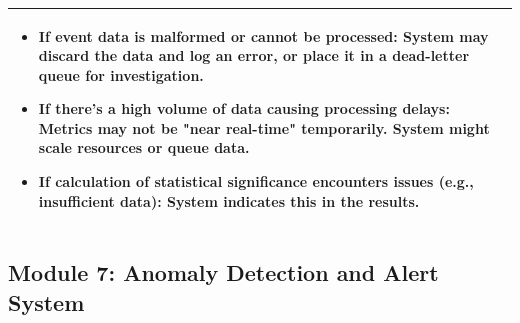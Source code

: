 \begin{minipage}{\textwidth}
\begin{tabularx}{\textwidth}{|p{}|X|}
{        \begin{itemize}
            \item If event data is malformed or cannot be processed: System may discard the data and log an error, or place it in a dead-letter queue for investigation.
            \item If there's a high volume of data causing processing delays: Metrics may not be "near real-time" temporarily. System might scale resources or queue data.
            \item If calculation of statistical significance encounters issues (e.g., insufficient data): System indicates this in the results.
        \end{itemize}%
        } \\
    \hline
\end{tabularx}
\end{minipage}
\bigskip

\subsection*{Module 7: Anomaly Detection and Alert System}
\label{module:minipage:anomaly_detection_alert}

